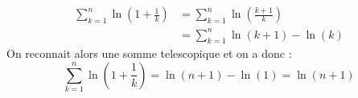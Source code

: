 
\begin{correction}  \; 
\begin{align*}
\sum_{k=1}^n \ln\left(1+\frac{1}{k} \right)&= 	\sum_{k=1}^n \ln\left(\frac{k+1}{k} \right)\\
								&= 	\sum_{k=1}^n \ln(k+1) -\ln(k)
\end{align*}
On reconnait alors une somme telescopique et on a donc :
$$\sum_{k=1}^n \ln\left(1+\frac{1}{k} \right) = \ln(n+1)-\ln(1) = \ln(n+1)$$

\end{correction}
